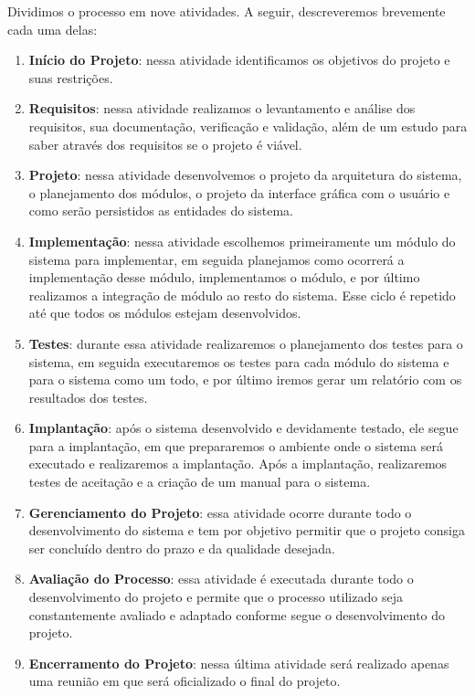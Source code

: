 Dividimos o processo em nove atividades. A seguir, descreveremos brevemente cada uma delas:
\begin{enumerate}
	\item \textbf{In\'icio do Projeto}: nessa atividade identificamos os objetivos do projeto e suas restri\c{c}\~oes.
	\item \textbf{Requisitos}: nessa atividade realizamos o levantamento e an\'alise dos requisitos, sua documenta\c{c}\~ao, verifica\c{c}\~ao e valida\c{c}\~ao, al\'em de um estudo para saber 
atrav\'es dos 
requisitos se o projeto \'e vi\'avel. 
	\item \textbf{Projeto}: nessa atividade desenvolvemos o projeto da arquitetura do sistema, o planejamento dos m\'odulos, o projeto da interface gr\'afica com o usu\'ario  e como ser\~ao 
persistidos as 
entidades do sistema.
	\item \textbf{Implementação}: nessa atividade escolhemos primeiramente um m\'odulo do sistema para implementar, em seguida planejamos como ocorrer\'a a implementa\c{c}\~ao desse 
m\'odulo, implementamos o m\'odulo, e por \'ultimo realizamos a integra\c{c}\~ao de m\'odulo ao resto do sistema. Esse ciclo \'e repetido at\'e que todos os m\'odulos estejam desenvolvidos.
	\item \textbf{Testes}: durante essa atividade realizaremos o planejamento dos testes para o sistema, em seguida executaremos os testes para cada m\'odulo do sistema e para o sistema como um todo, 
e 
por \'ultimo iremos gerar um relat\'orio com os resultados dos testes.
	\item \textbf{Implantação}: ap\'os o sistema desenvolvido e devidamente testado, ele segue para a implanta\c{c}\~ao, em que prepararemos o ambiente onde o sistema ser\'a executado e realizaremos 
a 
implanta\c{c}\~ao. Ap\'os a implanta\c{c}\~ao, realizaremos testes de aceita\c{c}\~ao e a cria\c{c}\~ao de um manual para o sistema.
	\item \textbf{Gerenciamento do Projeto}: essa atividade ocorre durante todo o desenvolvimento do sistema e tem por objetivo permitir que o projeto consiga ser conclu\'ido dentro do prazo e da 
qualidade 
desejada.
	\item \textbf{Avalia\c{c}\~ao do Processo}: essa atividade \'e executada durante todo o desenvolvimento do projeto e permite que o processo utilizado seja constantemente avaliado e adaptado 
conforme segue 
o desenvolvimento do projeto.
	\item \textbf{Encerramento do Projeto}: nessa \'ultima atividade ser\'a realizado apenas uma reuni\~ao em que ser\'a oficializado o final do projeto.
\end{enumerate}

